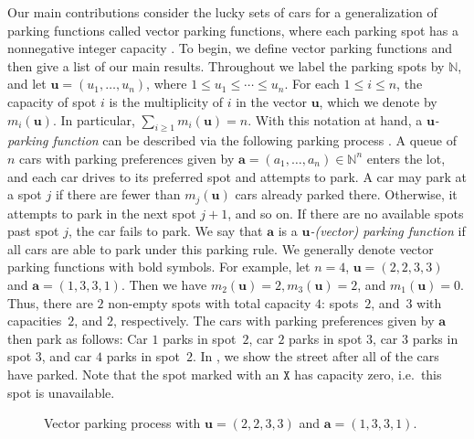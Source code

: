 \documentclass[reqno]{amsart}
\newcommand{\X}{\texttt{X}}
\theoremstyle{definition}
\theoremstyle{remark}
\newcommand{\NN}{\mathbb{N}}
\newcommand{\bsy}{\boldsymbol}
\begin{document}
Our main contributions consider the lucky sets of cars for a generalization of parking functions called vector parking functions, where each parking spot has a nonnegative integer capacity \cites{KungYan, PitmanStanley}. 
To begin, we define vector parking functions and then give a list of our main results. 
Throughout we label the parking spots by $\mathbb{N}$, and let $\bsy{u}=(u_1,\ldots,u_{n})$, where $1\leq u_1\leq \cdots\leq u_{n}$. 
For each $1\leq i\leq n$, the capacity of spot $i$ is the multiplicity of $i$ in the vector $\bsy{u}$, which we denote by $m_{i}(\bsy{u})$. 
In particular, $\sum_{i\geq 1} m_{i}(\bsy{u})=n$. 
With this notation at hand, a \emph{$\bsy{u}$-parking function} can be described via the following parking process \cite{2024primevectorparking}. A queue of $n$ cars with parking preferences given by $\bsy{a}=(a_1,\ldots,a_{n})\in\NN^n$ enters the lot, and each car drives to its preferred spot and attempts to park. 
A car may park at a spot $j$ if there are fewer than $m_{j}(\bsy{u})$ cars already parked there. 
Otherwise, it attempts to park in the next spot $j+1$, and so on. 
If there are no available spots past spot $j$, the car fails to park. 
We say that $\bsy{a}$ is a \emph{$\bsy{u}$-(vector) parking function} if all cars are able to park under this parking rule. We generally denote vector parking functions with bold symbols.
For example, let $n=4$, $\bsy{u}=(2,2,3,3)$ and $\bsy{a}=(1,3,3,1)$. Then we have $m_2(\bsy{u})=2, m_3(\bsy{u})=2$, and $m_{1}(\bsy{u})=0$. Thus, there are $2$ non-empty spots with total capacity $4$: spots~$2$, and~$3$ with capacities~$2$, and $2$, respectively. 
The cars with parking preferences given by $\bsy{a}$ then park as follows: Car $1$ parks in spot~$2$, car $2$ parks in spot $3$, car $3$ parks in spot $3$, and car $4$ parks in spot~$2$. In , we show the street after all of the cars have parked. Note that the spot marked with an $\X$ has capacity zero, i.e.\ this spot is unavailable.




\begin{figure}[!h]
    \centering
    \caption{Vector parking process with $\bsy{u}=(2,2,3,3)$ and $\bsy{a}=(1,3,3,1)$.}
    \label{fig:ps example}
\end{figure}
\end{document}
